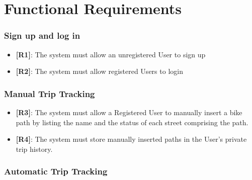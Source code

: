\section{Functional Requirements}
\label{sec:functional}

\subsubsection{Sign up and log in}

\begin{itemize}
    \item \textbf{[R1]}: The system must allow an unregistered User to sign up
    \item \textbf{[R2]}: The system must allow registered Users to login
\end{itemize}

\subsubsection{Manual Trip Tracking}

\begin{itemize}
    \item \textbf{[R3]}: The system must allow a Registered User to manually insert a bike path by listing the name and the status of each street comprising the path.
    \item \textbf{[R4]}: The system must store manually inserted paths in the User's private trip history.
\end{itemize}

\subsubsection{Automatic Trip Tracking}

